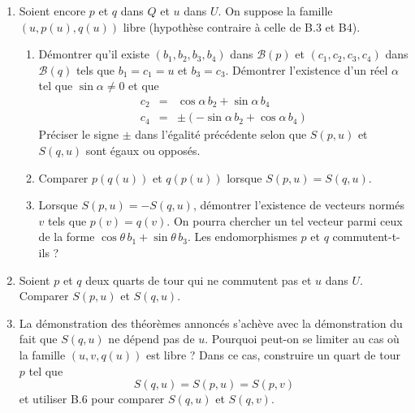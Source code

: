\begin{enumerate}
\item Soient encore $p$ et $q$ dans $Q$ et $u$ dans $U$. On suppose la famille $(u,p(u),q(u))$ libre (hypothèse contraire à celle de B.3 et B4).
\begin{enumerate}
\item Démontrer qu'il existe $(b_1,b_2,b_3,b_4)$ dans $\mathcal{B}(p)$ et $(c_1,c_2,c_3,c_4)$ dans $\mathcal{B}(q)$ tels que $b_1=c_1=u$ et $b_3=c_3$. Démontrer l'existence d'un réel $\alpha$ tel que $\sin \alpha \neq 0$ et que
\begin{eqnarray*}
c_2&=&\cos \alpha \, b_2 + \sin \alpha \, b_4 \\
c_4&=&\pm(-\sin \alpha \, b_2 + \cos \alpha \, b_4)
\end{eqnarray*}
Préciser le signe $\pm$ dans l'égalité précédente selon que $S(p,u)$ et $S(q,u)$ sont égaux ou opposés.
\item Comparer $p(q(u))$ et $q(p(u))$ lorsque $S(p,u)=S(q,u)$.
\item Lorsque $S(p,u)=-S(q,u)$, démontrer l'existence de vecteurs normés $v$ tels que $p(v)=q(v)$. On pourra chercher un tel vecteur parmi ceux de la forme $\cos \theta \, b_1 + \sin \theta \, b_3$. Les endomorphismes $p$ et $q$ commutent-t-ils ?
\end{enumerate}
\item Soient $p$ et $q$ deux quarts de tour qui ne commutent pas et $u$ dans $U$. Comparer $S(p,u)$ et $S(q,u)$.
\item La démonstration des théorèmes annoncés s'achève avec la démonstration du fait que $S(q,u)$ ne dépend pas de $u$.\newline
Pourquoi peut-on se limiter au cas où la famille $(u,v,q(u))$ est libre ? Dans ce cas, construire un quart de tour $p$ tel que
\[S(q,u)=S(p,u)=S(p,v)\]
et utiliser B.6 pour comparer $S(q,u)$ et $S(q,v)$.
\end{enumerate}
